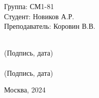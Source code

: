 \vspace{3cm}
\begin{flushright}
    \begin{minipage}{0.6\linewidth}
        \begin{flushleft}
            Группа: СМ1-81
            \\
            Студент: Новиков А.Р.
            \\
            \vspace{3ex}
            Преподаватель: Коровин В.В.
        \end{flushleft}
    \end{minipage}
    \begin{minipage}{0.3\linewidth}
        \begin{center}
            \vspace{9ex}
            \underline{\hspace{5cm}} 
            \\
            \footnotesize (Подпись, дата)
            \\[10pt]
            \underline{\hspace{5cm}} 
            \\
            \footnotesize (Подпись, дата)
        \end{center}
    \end{minipage}
\end{flushright}
\begin{table}[b]
    \center Москва, 2024
\end{table}
\thispagestyle{empty}